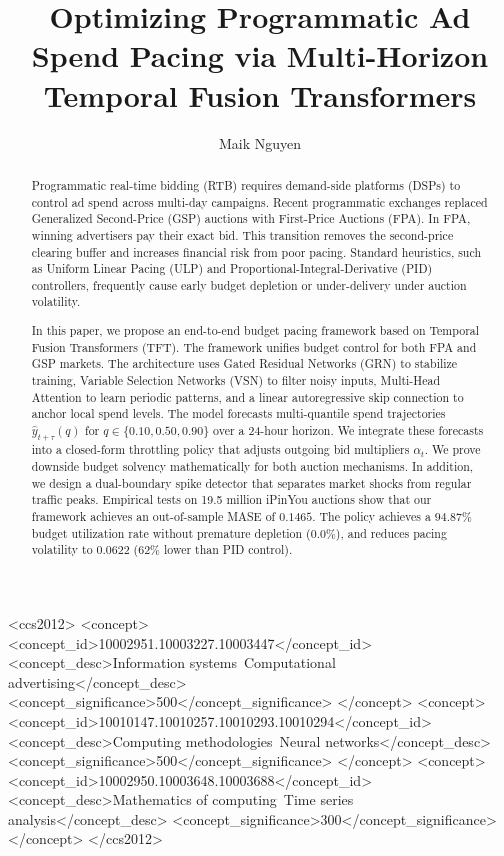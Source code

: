\documentclass[sigconf]{acmart}
\begin{document}
\title{Optimizing Programmatic Ad Spend Pacing via Multi-Horizon Temporal Fusion Transformers}

\author{Maik Nguyen}

\begin{abstract}
Programmatic real-time bidding (RTB) requires demand-side platforms (DSPs) to control ad spend across multi-day campaigns. Recent programmatic exchanges replaced Generalized Second-Price (GSP) auctions with First-Price Auctions (FPA). In FPA, winning advertisers pay their exact bid. This transition removes the second-price clearing buffer and increases financial risk from poor pacing. Standard heuristics, such as Uniform Linear Pacing (ULP) and Proportional-Integral-Derivative (PID) controllers, frequently cause early budget depletion or under-delivery under auction volatility. 

In this paper, we propose an end-to-end budget pacing framework based on Temporal Fusion Transformers (TFT). The framework unifies budget control for both FPA and GSP markets. The architecture uses Gated Residual Networks (GRN) to stabilize training, Variable Selection Networks (VSN) to filter noisy inputs, Multi-Head Attention to learn periodic patterns, and a linear autoregressive skip connection to anchor local spend levels. The model forecasts multi-quantile spend trajectories $\hat{y}_{t+\tau}(q)$ for $q \in \{0.10, 0.50, 0.90\}$ over a 24-hour horizon. We integrate these forecasts into a closed-form throttling policy that adjusts outgoing bid multipliers $\alpha_t$. We prove downside budget solvency mathematically for both auction mechanisms. In addition, we design a dual-boundary spike detector that separates market shocks from regular traffic peaks. Empirical tests on 19.5 million iPinYou auctions show that our framework achieves an out-of-sample MASE of $0.1465$. The policy achieves a $94.87\%$ budget utilization rate without premature depletion ($0.0\%$), and reduces pacing volatility to $0.0622$ ($62\%$ lower than PID control).
\end{abstract}

\begin{CCSXML}
<ccs2012>
   <concept>
       <concept_id>10002951.10003227.10003447</concept_id>
       <concept_desc>Information systems~Computational advertising</concept_desc>
       <concept_significance>500</concept_significance>
       </concept>
   <concept>
       <concept_id>10010147.10010257.10010293.10010294</concept_id>
       <concept_desc>Computing methodologies~Neural networks</concept_desc>
       <concept_significance>500</concept_significance>
       </concept>
   <concept>
       <concept_id>10002950.10003648.10003688</concept_id>
       <concept_desc>Mathematics of computing~Time series analysis</concept_desc>
       <concept_significance>300</concept_significance>
       </concept>
 </ccs2012>
\end{CCSXML}
\end{document}
